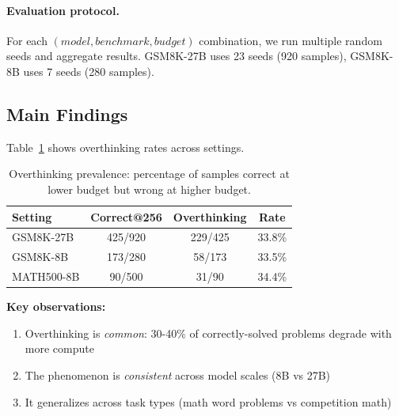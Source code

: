 \paragraph{Evaluation protocol.} For each $(model, benchmark, budget)$ combination, we run multiple random seeds and aggregate results.
GSM8K-27B uses 23 seeds (920 samples), GSM8K-8B uses 7 seeds (280 samples).

\subsection{Main Findings}

Table~\ref{tab:overthinking_rates} shows overthinking rates across settings.

\begin{table}[h]
\centering
\caption{Overthinking prevalence: percentage of samples correct at lower budget but wrong at higher budget.}
\label{tab:overthinking_rates}
\begin{tabular}{lccc}
\toprule
Setting & Correct@256 & Overthinking & Rate \\
\midrule
GSM8K-27B & 425/920 & 229/425 & 33.8\% \\
GSM8K-8B & 173/280 & 58/173 & 33.5\% \\
\midrule
MATH500-8B & 90/500 & 31/90 & 34.4\% \\
\bottomrule
\end{tabular}
\end{table}

\textbf{Key observations:}
\begin{enumerate}[nosep]
\item Overthinking is \emph{common}: 30-40\% of correctly-solved problems degrade with more compute
\item The phenomenon is \emph{consistent} across model scales (8B vs 27B)
\item It generalizes across task types (math word problems vs competition math)
\end{enumerate}
